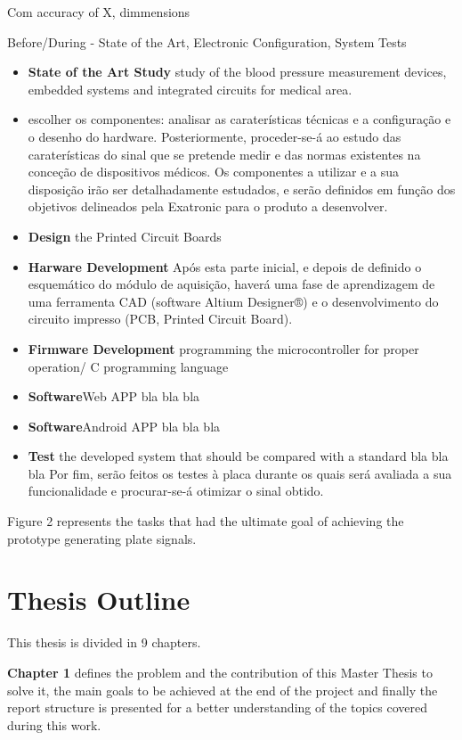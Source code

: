 Com accuracy of X, dimmensions

Before/During - State of the Art, Electronic Configuration, System Tests

\begin{itemize}
\item \textbf {State of the Art Study} study of the blood pressure measurement devices, embedded systems and integrated circuits for medical area.
\item escolher os componentes: analisar as caraterísticas técnicas e a configuração e o desenho do hardware. Posteriormente, proceder-se-á
ao estudo das caraterísticas do sinal que se pretende medir e das normas existentes na conceção de dispositivos médicos. Os componentes a utilizar e a sua disposição irão ser detalhadamente estudados, e serão definidos em função dos objetivos delineados pela Exatronic para o produto a desenvolver.
\item \textbf {Design} the Printed Circuit Boards
  \item \textbf {Harware Development } Após esta parte inicial, e depois de definido o esquemático do módulo de aquisição,
haverá uma fase de aprendizagem de uma ferramenta CAD (software Altium
Designer®) e o desenvolvimento do circuito impresso (PCB, Printed Circuit Board).
  \item \textbf {Firmware Development} programming the microcontroller for proper operation/ C programming language
  \item \textbf{Software}Web APP bla bla bla
  \item \textbf{Software}Android APP bla bla bla
  \item \textbf{Test} the developed system that should be compared with a standard bla bla bla Por fim, serão feitos os testes à placa durante os quais será avaliada a sua funcionalidade e procurar-se-á otimizar o sinal obtido.
\end{itemize}

Figure 2 represents the tasks that had the ultimate goal of achieving the prototype generating plate signals.

\section{Thesis Outline}

This thesis is divided in 9 chapters.

\textbf {Chapter 1} defines the problem and the contribution of this Master Thesis to solve it, the main goals to be achieved at the end of the project and finally the report structure is presented for a better understanding of the topics covered during this work. 

